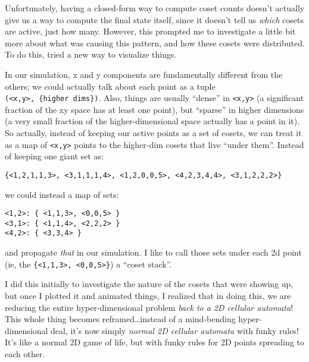 \documentclass[]{article}
\begin{document}
Unfortunately, having a closed-form way to compute coset counts doesn't actually
give us a way to compute the final state itself, since it doesn't tell us
\emph{which} cosets are active, just how many. However, this prompted me to
investigate a little bit more about what was causing this pattern, and how these
cosets were distributed. To do this, tried a new way to visualize things.

In our simulation, x and y components are fundamentally different from the
others; we could actually talk about each point as a tuple
\texttt{(\textless{}x,y\textgreater{},\ \{higher\ dims\})}. Also, things are
usually ``dense'' in \texttt{\textless{}x,y\textgreater{}} (a significant
fraction of the xy space has at least one point), but ``sparse'' in higher
dimensions (a very small fraction of the higher-dimensional space actually has a
point in it). So actually, instead of keeping our active points as a set of
cosets, we can treat it as a map of \texttt{\textless{}x,y\textgreater{}} points
to the higher-dim cosets that live ``under them''. Instead of keeping one giant
set as:

\begin{verbatim}
{<1,2,1,1,3>, <3,1,1,1,4>, <1,2,0,0,5>, <4,2,3,4,4>, <3,1,2,2,2>}
\end{verbatim}

we could instead a map of sets:

\begin{verbatim}
<1,2>: { <1,1,3>, <0,0,5> }
<3,1>: { <1,1,4>, <2,2,2> }
<4,2>: { <3,3,4> }
\end{verbatim}

and propagate \emph{that} in our simulation. I like to call those sets under
each 2d point (ie, the
\texttt{\{\textless{}1,1,3\textgreater{},\ \textless{}0,0,5\textgreater{}\}}) a
``coset stack''.

I did this initially to investigate the nature of the cosets that were showing
up, but once I plotted it and animated things, I realized that in doing this, we
are reducing the entire hyper-dimensional problem \emph{back to a 2D cellular
automata}! This whole thing becomes reframed\ldots instead of a mind-bending
hyper-dimensional deal, it's now simply \emph{normal 2D cellular automata} with
funky rules! It's like a normal 2D game of life, but with funky rules for 2D
points spreading to each other.
\end{document}
